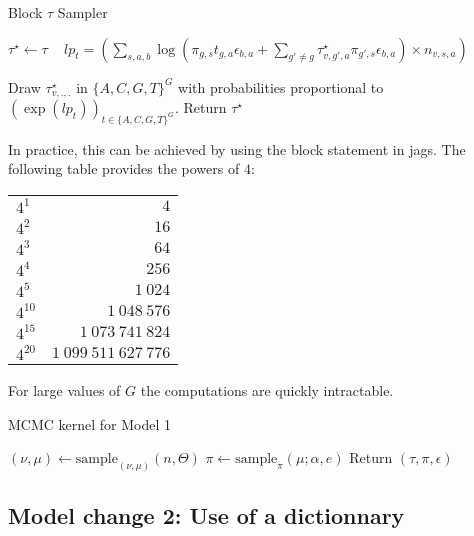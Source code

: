 \documentclass{article}
\begin{document}
\begin{algorithm}[H]
\caption{Block $\tau$ Sampler }\label{alg:desman_tau}
\begin{algorithmic}
\State $\tau^\star\gets\tau$
  \ 
    \State   $lp_t=  \left(\sum_{s,a,b}      \log\left(\pi_{g,s}t_{g,a}\epsilon_{b,a}+\sum_{g'\neq g}\tau^\star_{v,g',a}\pi_{g',s}\epsilon_{b,a}\right)\times n_{v,s,a}\right)$
 \EndFor
    
    \State Draw $\tau^\star_{v,.,.}$ in $\{A,C,G,T\}^G$ with probabilities proportional to $\left(\exp(lp_t)\right)_{t\in\{A,C,G,T\}^G}$.
 \EndFor
\State Return $\tau^\star$
\EndProcedure
\end{algorithmic}
\end{algorithm}

In practice, this can be achieved by using the block statement in jags.
The following table provides the powers of $4$:
\begin{table}[H]
\centering
\begin{tabular}{lr}
  \hline
$4^{1}$&$4$\\$4^{2}$&$16$\\$4^{3}$&$64$\\$4^{4}$&$256$\\$4^{5}$&$1~024$\\$4^{10}$&$1~048~576$\\$4^{15}$&$1~073~741~824$\\$4^{20}$&$1~099~511~627~776$\\   \hline
\end{tabular}
\end{table}
For large values of $G$ the computations are quickly intractable.
\begin{algorithm}[H]
\caption{MCMC kernel for Model 1}\label{alg:mcmck}
\begin{algorithmic}
\State $(\nu,\mu)\gets{\mathrm{sample}_{(\nu,\mu)}(n,\Theta)}$
\State $\pi\gets\mathrm{sample}_\pi(\mu;\alpha,e)$
\State Return $\left(\tau,\pi,\epsilon\right)$
\EndProcedure
\end{algorithmic}
\end{algorithm}


\subsection{Model change 2: Use of a dictionnary}
\end{document}
